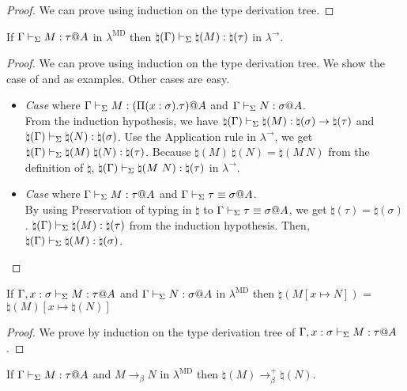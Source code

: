 \begin{proof}
	We can prove using induction on the type derivation tree.
\end{proof}
	
\begin{lemma}
	If $\G \V M:\tau@A$ in $\lambda^{\text{MD}}$ then $\natural(\Gamma) \vdash_\Sigma \natural(M): \natural(\tau)$ in $\lambda^\to$.
\end{lemma}

\begin{proof}
	We can prove using induction on the type derivation tree.
	We show the case of \TApp{} and \TConv{} as examples.
	Other cases are easy.
\begin{itemize}
	\item \textit{Case} \TApp{} where $\Gamma \vdash_\Sigma M : (\Pi(x:\sigma).\tau) @ A$ and $\Gamma \vdash_\Sigma N :\sigma @A$.\\
	      From the induction hypothesis, we have $\natural(\Gamma) \vdash_\Sigma \natural(M) : \natural(\sigma) \to \natural(\tau)$ and $\natural(\Gamma) \vdash_\Sigma \natural(N) : \natural(\sigma)$.
	      Use the Application rule in $\lambda^\to$, we get $\natural(\G) \V \natural(M)\ \natural(N) : \natural(\tau)$.
	      Because $\natural(M)\ \natural(N) = \natural(M\ N)$ from the definition of $\natural$, $\natural(\Gamma) \vdash_\Sigma \natural(M\ N) : \natural(\tau)$ in $\lambda^\to$.
	\item \textit{Case} \TConv{} where $\G\V M:\tau@A$ and $\G\V \tau\E\sigma@A$.\\
	      By using Preservation of typing in $\natural$ to $\G\V \tau\E\sigma@A$, we get $\natural(\tau) = \natural(\sigma)$.
	      $\natural(\Gamma) \vdash_\Sigma \natural(M):\natural(\tau)$ from the induction hypothesis.
	      Then, $\natural(\Gamma) \vdash_\Sigma \natural(M):\natural(\sigma)$.
\end{itemize}
\end{proof}

\begin{lemma}
	If $\G, x:\sigma \V M:\tau@A$ and $\G \V N:\sigma@A$ in $\lambda^{\text{MD}}$
	then $\natural(M[x \mapsto N])$ = $\natural(M)[x\mapsto\natural(N)]$
\end{lemma}

\begin{proof}
We prove by induction on the type derivation tree of $\G, x:\sigma \V M:\tau@A$.
\end{proof}
	
\begin{lemma}
	If $\G \V M:\tau@A$ and $M \longrightarrow_\beta N$ in $\lambda^{\text{MD}}$
	then $\natural(M) \longrightarrow_\beta^+ \natural(N)$.
\end{lemma}

